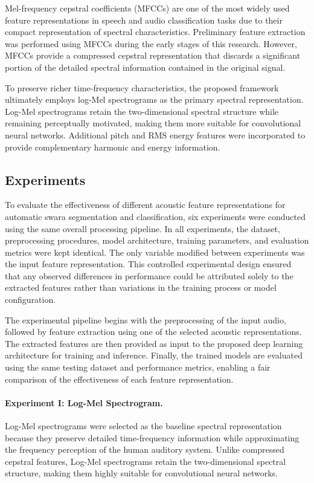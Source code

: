 Mel-frequency cepstral coefficients (MFCCs) are one of the most widely used feature representations in speech and audio classification tasks due to their compact representation of spectral characteristics. Preliminary feature extraction was performed using MFCCs during the early stages of this research. However, MFCCs provide a compressed cepstral representation that discards a significant portion of the detailed spectral information contained in the original signal.

To preserve richer time-frequency characteristics, the proposed framework ultimately employs log-Mel spectrograms as the primary spectral representation. Log-Mel spectrograms retain the two-dimensional spectral structure while remaining perceptually motivated, making them more suitable for convolutional neural networks. Additional pitch and RMS energy features were incorporated to provide complementary harmonic and energy information.

\subsection{Experiments}

To evaluate the effectiveness of different acoustic feature representations for automatic swara segmentation and classification, six experiments were conducted using the same overall processing pipeline. In all experiments, the dataset, preprocessing procedures, model architecture, training parameters, and evaluation metrics were kept identical. The only variable modified between experiments was the input feature representation. This controlled experimental design ensured that any observed differences in performance could be attributed solely to the extracted features rather than variations in the training process or model configuration.

The experimental pipeline begins with the preprocessing of the input audio, followed by feature extraction using one of the selected acoustic representations. The extracted features are then provided as input to the proposed deep learning architecture for training and inference. Finally, the trained models are evaluated using the same testing dataset and performance metrics, enabling a fair comparison of the effectiveness of each feature representation.

\paragraph{Experiment I: Log-Mel Spectrogram.} Log-Mel spectrograms were selected as the baseline spectral representation because they preserve detailed time-frequency information while approximating the frequency perception of the human auditory system. Unlike compressed cepstral features, Log-Mel spectrograms retain the two-dimensional spectral structure, making them highly suitable for convolutional neural networks.

